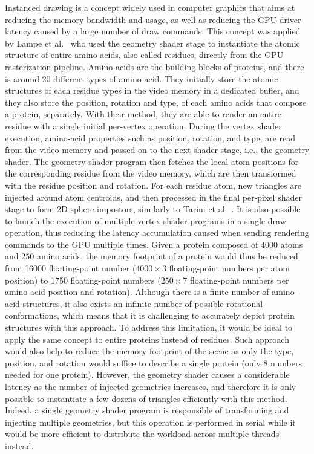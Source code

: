 Instanced drawing is a concept widely used in computer graphics that aims at reducing the memory bandwidth and usage, as well as reducing the GPU-driver latency caused by a large number of draw commands.
This concept was applied by Lampe et al.~\cite{lampe2007two} who used the geometry shader stage to instantiate the atomic structure of entire amino acids, also called residues, directly from the GPU rasterization pipeline.
Amino-acids are the building blocks of proteins, and there is around 20 different types of amino-acid.
They initially store the atomic structures of each residue types in the video memory in a dedicated buffer, and they also store the position, rotation and type, of each amino acids that compose a protein, separately.
With their method, they are able to render an entire residue with a single initial per-vertex operation.
During the vertex shader execution, amino-acid properties such as position, rotation, and type, are read from the video memory and passed on to the next shader stage, i.e., the geometry shader.
The geometry shader program then fetches the local atom positions for the corresponding residue from the video memory, which are then transformed with the residue position and rotation.
For each residue atom, new triangles are injected around atom centroids, and then processed in the final per-pixel shader stage to form 2D sphere impostors, similarly to Tarini et al.~\cite{tarini2006ambient}.
It is also possible to launch the execution of multiple vertex shader programs in a single draw operation, thus reducing the latency accumulation caused when sending rendering commands to the GPU multiple times.
Given a protein composed of $4000$ atoms and $250$ amino acids, the memory footprint of a protein would thus be reduced from 16000 floating-point number ($4000 \times 3$ floating-point numbers per atom position) to 1750 floating-point numbers ($250 \times 7$ floating-point numbers per amino acid position and rotation).
Although there is a finite number of amino-acid structures, it also exists an infinite number of possible rotational conformations, which means that it is challenging to accurately depict protein structures with this approach.
To address this limitation, it would be ideal to apply the same concept to entire proteins instead of residues.
Such approach would also help to reduce the memory footprint of the scene as only the type, position, and rotation would suffice to describe a single protein (only 8 numbers needed for one protein).
However, the geometry shader causes a considerable latency as the number of injected geometries increases, and therefore it is only possible to instantiate a few dozens of triangles efficiently with this method.
Indeed, a single geometry shader program is responsible of transforming and injecting multiple geometries, but this operation is performed in serial while it would be more efficient to distribute the workload across multiple threads instead.

